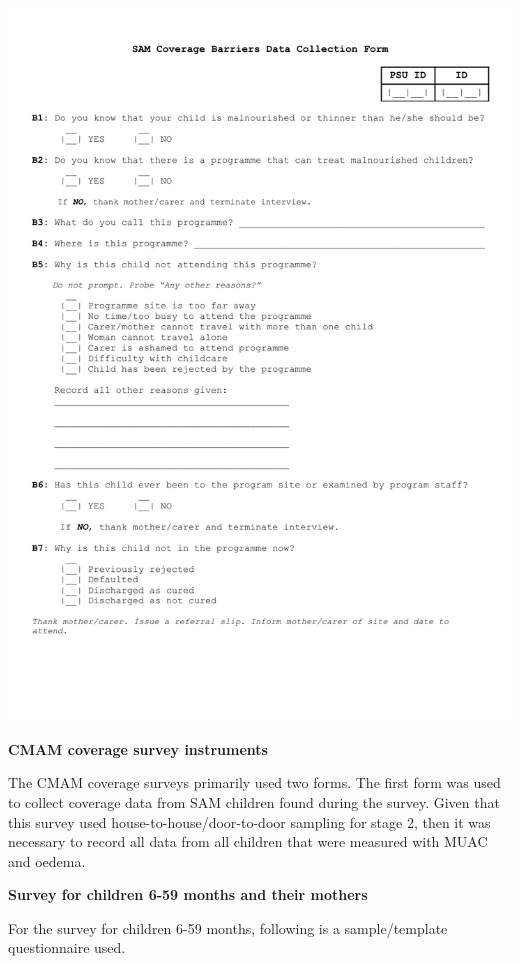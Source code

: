 \documentclass[12pt,a4paper]{article}
\begin{document}
\begin{center}\includegraphics[width=0.9\linewidth]{forms/samBarriersForm} \end{center}

\textbf{CMAM coverage survey instruments}

The CMAM coverage surveys primarily used two forms. The first form was used to collect coverage data from SAM children found during the survey. Given that this survey used house-to-house/door-to-door sampling for stage 2, then it was necessary to record all data from all children that were measured with MUAC and oedema.

\textbf{Survey for children 6-59 months and their mothers}

For the survey for children 6-59 months, following is a sample/template questionnaire used.
\end{document}
